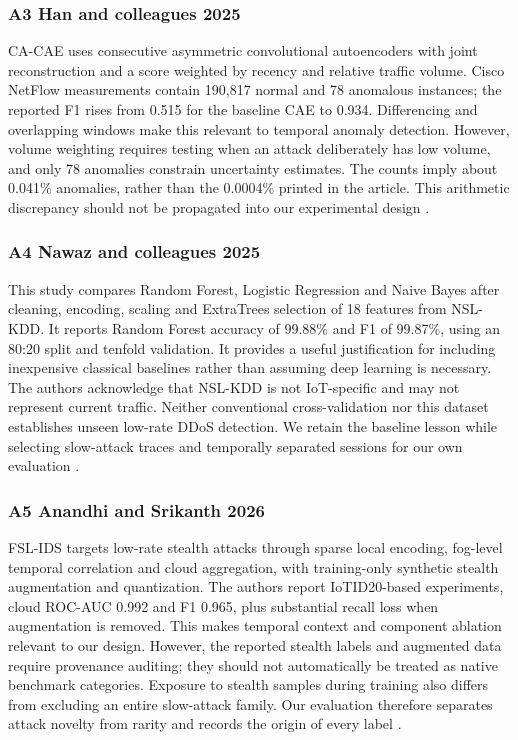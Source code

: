 \documentclass[conference]{IEEEtran}
\begin{document}
\subsubsection{A3 Han and colleagues 2025}
CA-CAE uses consecutive asymmetric convolutional autoencoders with joint reconstruction and a score weighted by recency and relative traffic volume. Cisco NetFlow measurements contain 190,817 normal and 78 anomalous instances; the reported F1 rises from 0.515 for the baseline CAE to 0.934. Differencing and overlapping windows make this relevant to temporal anomaly detection. However, volume weighting requires testing when an attack deliberately has low volume, and only 78 anomalies constrain uncertainty estimates. The counts imply about 0.041\% anomalies, rather than the 0.0004\% printed in the article. This arithmetic discrepancy should not be propagated into our experimental design \cite{ref6}.

\subsubsection{A4 Nawaz and colleagues 2025}
This study compares Random Forest, Logistic Regression and Naive Bayes after cleaning, encoding, scaling and ExtraTrees selection of 18 features from NSL-KDD. It reports Random Forest accuracy of 99.88\% and F1 of 99.87\%, using an 80:20 split and tenfold validation. It provides a useful justification for including inexpensive classical baselines rather than assuming deep learning is necessary. The authors acknowledge that NSL-KDD is not IoT-specific and may not represent current traffic. Neither conventional cross-validation nor this dataset establishes unseen low-rate DDoS detection. We retain the baseline lesson while selecting slow-attack traces and temporally separated sessions for our own evaluation \cite{ref7}.

\subsubsection{A5 Anandhi and Srikanth 2026}
FSL-IDS targets low-rate stealth attacks through sparse local encoding, fog-level temporal correlation and cloud aggregation, with training-only synthetic stealth augmentation and quantization. The authors report IoTID20-based experiments, cloud ROC-AUC 0.992 and F1 0.965, plus substantial recall loss when augmentation is removed. This makes temporal context and component ablation relevant to our design. However, the reported stealth labels and augmented data require provenance auditing; they should not automatically be treated as native benchmark categories. Exposure to stealth samples during training also differs from excluding an entire slow-attack family. Our evaluation therefore separates attack novelty from rarity and records the origin of every label \cite{ref8}.
\end{document}
